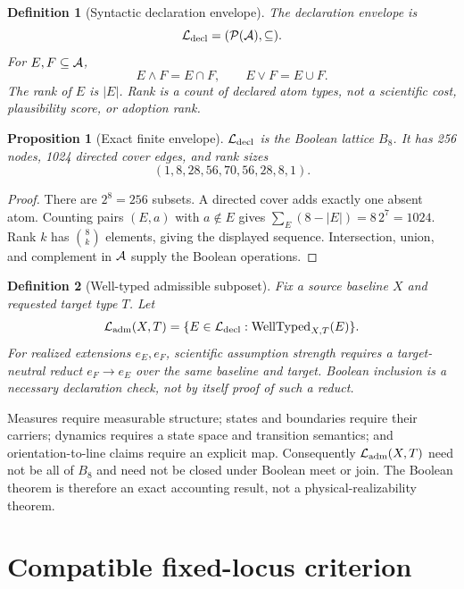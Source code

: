 \documentclass[11pt]{article}
\newcommand{\Pow}{\mathcal{P}}
\newtheorem{definition}{Definition}
\newtheorem{proposition}{Proposition}
\begin{document}
\begin{definition}[Syntactic declaration envelope]
The declaration envelope is
\[
 {\cal L}_{\mathrm{decl}}=(\Pow({\cal A}),\subseteq).
\]
For \(E,F\subseteq{\cal A}\),
\[
 E\wedge F=E\cap F,\qquad E\vee F=E\cup F.
\]
The rank of \(E\) is \(|E|\).  Rank is a count of declared atom types, not a
scientific cost, plausibility score, or adoption rank.
\end{definition}

\begin{proposition}[Exact finite envelope]
\({\cal L}_{\mathrm{decl}}\) is the Boolean lattice \(B_8\).  It has 256 nodes,
1024 directed cover edges, and rank sizes
\[
 (1,8,28,56,70,56,28,8,1).
\]
\end{proposition}

\begin{proof}
There are \(2^8=256\) subsets.  A directed cover adds exactly one absent atom.
Counting pairs \((E,a)\) with \(a\notin E\) gives
\(\sum_E(8-|E|)=8\,2^7=1024\).  Rank \(k\) has
\(\binom{8}{k}\) elements, giving the displayed sequence.  Intersection,
union, and complement in \({\cal A}\) supply the Boolean operations.
\end{proof}

\begin{definition}[Well-typed admissible subposet]
Fix a source baseline \(X\) and requested target type \(T\).  Let
\[
 {\cal L}_{\mathrm{adm}}(X,T)
 =\{E\in{\cal L}_{\mathrm{decl}}:\operatorname{WellTyped}_{X,T}(E)\}.
\]
For realized extensions \(e_E,e_F\), scientific assumption strength requires
a target-neutral reduct \(e_F\to e_E\) over the same baseline and target.
Boolean inclusion is a necessary declaration check, not by itself proof of
such a reduct.
\end{definition}

Measures require measurable structure; states and boundaries require their
carriers; dynamics requires a state space and transition semantics; and
orientation-to-line claims require an explicit map.  Consequently
\({\cal L}_{\mathrm{adm}}(X,T)\) need not be all of \(B_8\) and need not be
closed under Boolean meet or join.  The Boolean theorem is therefore an exact
accounting result, not a physical-realizability theorem.

\section{Compatible fixed-locus criterion}
\end{document}
